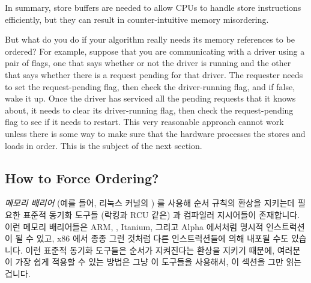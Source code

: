 In summary, store buffers are needed to allow CPUs to handle
store instructions efficiently, but they can result in
counter-intuitive memory misordering.

But what do you do if your algorithm really needs its memory
references to be ordered?
For example, suppose that you are communicating with a driver using
a pair of flags, one that says whether or not the driver is running
and the other that says whether there is a request pending for that
driver.
The requester needs to set the request-pending flag, then check
the driver-running flag, and if false, wake it up.
Once the driver has serviced all the pending requests that it knows about,
it needs to clear its driver-running flag, then check the request-pending
flag to see if it needs to restart.
This very reasonable approach cannot work unless there is some way
to make sure that the hardware processes the stores and loads in order.
This is the subject of the next section.
\fi

\subsection{How to Force Ordering?}
\label{sec:memorder:How to Force Ordering?}

\emph{메모리 배리어} (예를 들어, 리눅스 커널의 ) 를 사용해 순서
규칙의 환상을 지키는데 필요한 표준적 동기화 도구들 (락킹과 RCU 같은) 과
컴파일러 지시어들이 존재합니다.
이런 메모리 배리어들은 ARM, \Power{}, Itanium, 그리고 Alpha 에서처럼 명시적
인스트럭션이 될 수 있고, x86 에서 종종 그런 것처럼 다른 인스트럭션들에 의해
내포될 수도 있습니다.
이런 표준적 동기화 도구들은 순서가 지켜진다는 환상을 지키기 때문에, 여러분이
가장 쉽게 적용할 수 있는 방법은 그냥 이 도구들을 사용해서, 이 섹션을 그만 읽는
겁니다.

